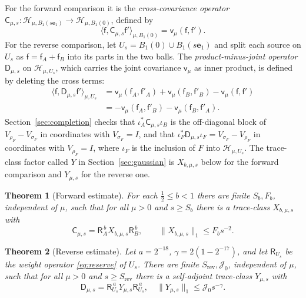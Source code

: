 \documentclass[aps,prl,reprint,longbibliography,raggedbottom]{revtex4-2}
\newtheorem{theorem}{Theorem}
\newcommand{\norm}[1]{\lVert #1\rVert}
\newcommand{\ip}[2]{\langle #1,#2\rangle}
\newcommand{\Hh}{\mathcal H}
\newcommand{\Res}{\mathsf R}
\newcommand{\JointRes}{\Res_{U_s}}
\newcommand{\JointD}{\mathsf D}
\newcommand{\cov}{\mathsf v}
\newcommand{\sx}{\mathsf f}
\newcommand{\sy}{\mathsf f'}
\newcommand{\eone}{\mathbf e_1}
\begin{document}
For the forward comparison it is the \emph{cross-covariance
operator} $\mathsf C_{\mu,s}\colon\Hh_{\mu,B_1(s\eone)}\to\Hh_{\mu,B_1(0)}$,
defined by
\begin{equation}
\ip\sx{\mathsf C_{\mu,s}\sy}_{\mu,B_1(0)}=\cov_\mu(\sx,\sy).
\label{eq:C-def}
\end{equation}
For the reverse comparison, let $U_s=B_1(0)\cup B_1(s\eone)$ and
split each source on $U_s$ as $\sx=\sx_A+\sx_B$ into its parts in the
two balls. The \emph{product-minus-joint operator} $\JointD_{\mu,s}$
on $\Hh_{\mu,U_s}$, which carries the joint covariance $\cov_\mu$ as
inner product, is defined by deleting the cross terms:
\begin{equation}
\begin{split}
\ip\sx{\JointD_{\mu,s}\sy}_{\mu,U_s}
&=\cov_\mu(\sx_A,\sy_A)+\cov_\mu(\sx_B,\sy_B)-\cov_\mu(\sx,\sy)\\
&=-\cov_\mu(\sx_A,\sy_B)-\cov_\mu(\sx_B,\sy_A).
\end{split}
\label{eq:D-joint}
\end{equation}
Section~\ref{sec:completion} checks that
$\iota_A^*\mathsf C_{\mu,s}\iota_B$ is the off-diagonal block of
$V_{\rho_F}-V_{\sigma_F}$ in coordinates with $V_{\sigma_F}=I$, and
that $\iota_F^*\JointD_{\mu,s}\iota_F=V_{\sigma_F}-V_{\rho_F}$ in
coordinates with $V_{\rho_F}=I$, where $\iota_F$ is the inclusion of
$F$ into $\Hh_{\mu,U_s}$. The trace-class factor called $Y$ in
Section~\ref{sec:gaussian} is $X_{b,\mu,s}$ below for the forward
comparison and $Y_{\mu,s}$ for the reverse one.

\begin{theorem}[Forward estimate]\label{thm:forward}
For each $\frac12\le b<1$ there are finite $S_b,F_b$, independent of
$\mu$, such that for all $\mu>0$ and $s\ge S_b$ there is a trace-class
$X_{b,\mu,s}$ with
\begin{equation}
\mathsf C_{\mu,s}=\Res_A^{\,b}X_{b,\mu,s}\Res_B^{\,b},\qquad
\norm{X_{b,\mu,s}}_1\le F_bs^{-2}.
\label{eq:forward-trace}
\end{equation}
\end{theorem}

\begin{theorem}[Reverse estimate]\label{thm:reverse}
Let $a=2^{-18}$, $\gamma=2(1-2^{-17})$, and let $\JointRes$ be the
weight operator \eqref{eq:reserve} of $U_s$. There are finite
$S_{\mathrm{rev}},\mathcal J_0$, independent of $\mu$, such that for
all $\mu>0$ and $s\ge S_{\mathrm{rev}}$ there is a self-adjoint
trace-class $Y_{\mu,s}$ with
\begin{equation}
\JointD_{\mu,s}=\JointRes^{\,a}Y_{\mu,s}\JointRes^{\,a},
\quad
\norm{Y_{\mu,s}}_1\le\mathcal J_0s^{-\gamma}.
\label{eq:reverse-trace}
\end{equation}
\end{theorem}
\end{document}
